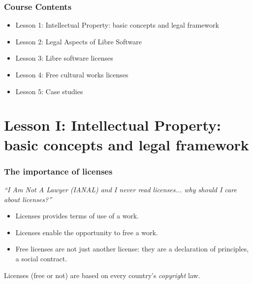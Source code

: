 

\begin{frame}
  \frametitle{Course Contents}

  \begin{itemize}
    \item Lesson 1: Intellectual Property: basic concepts and legal framework
    \item Lesson 2: Legal Aspects of Libre Software
    \item Lesson 3: Libre software licenses
    \item Lesson 4: Free cultural works licenses
    \item Lesson 5: Case studies
  \end{itemize}

\end{frame}


\section{Lesson I: Intellectual Property: basic concepts and legal framework}








\begin{frame}
\frametitle{The importance of licenses}
\textit{``\alert{I} \alert{A}m \alert{N}ot \alert{A} \alert{L}awyer (IANAL) and I never read licenses... why should I care about licenses?''}

\pause

\begin{itemize}[<+->]
\item Licenses provides terms of use of a work.
\item Licenses enable the opportunity to free a work.
\item Free licenses are not just another license: they are a declaration of principles, a social contract.
\end{itemize}
\bigskip

\pause

\alert{Licenses (free or not) are based on every country's \textit{copyright} law.}

\end{frame}

